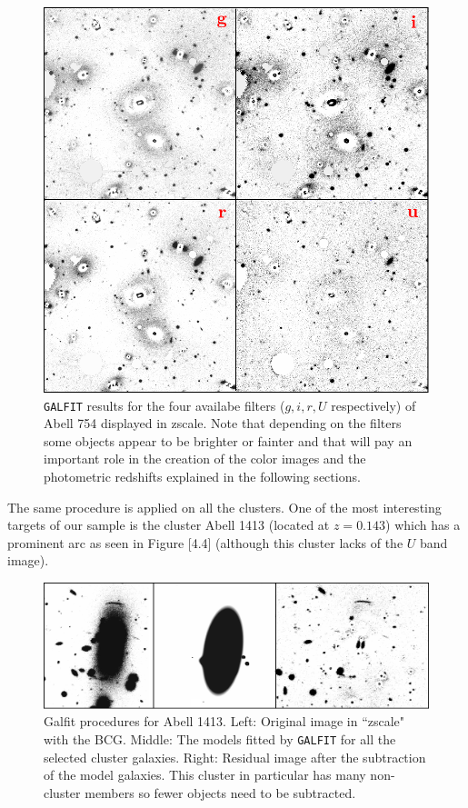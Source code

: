\begin{figure}[H]
\centering
\includegraphics[width=12cm]{images/filters_A754.png}
\caption[All filters' results for Abell 754]{\texttt{GALFIT} results for the four availabe filters ($g,i,r,U$ respectively) of Abell 754 displayed in zscale. Note that depending on the filters some objects appear to be brighter or fainter and that will pay an important role in the creation of the color images and the photometric redshifts explained in the following sections.}
\end{figure}

The same procedure is applied on all the clusters. One of the most interesting targets of our sample is the cluster Abell 1413 (located at $z=0.143$) which has a prominent arc as seen in Figure [4.4] (although this cluster lacks of the $U$ band image). 

\begin{figure}[H]
\centering
\includegraphics[width=15cm]{images/A1413.png}
\caption[Galfit results for Abell 1413]{Galfit procedures for  Abell 1413. Left: Original image in ``zscale" with the BCG. Middle: The models fitted by \texttt{GALFIT} for all the selected cluster galaxies. Right: Residual image after the subtraction of the model galaxies. This cluster in particular has many non-cluster members so fewer objects need to be subtracted.}
\end{figure}

